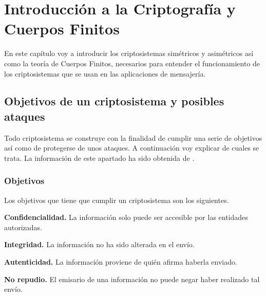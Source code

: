 \chapter{Introducción a la Criptografía y Cuerpos Finitos}
En este capítulo voy a introducir los criptosistemas simétricos y asimétricos así como la teoría de Cuerpos Finitos, necesarios para entender el funcionamiento de los criptosistemas que se usan en las aplicaciones de mensajería.\\

\section{Objetivos de un criptosistema y posibles ataques}
Todo criptosistema se construye con la finalidad de cumplir una serie de objetivos así como de protegerse de unos ataques. A continuación voy explicar de cuales se trata.
La información de este apartado ha sido obtenida de \cite{apuntesCriptografia}.\\ 
\subsection{Objetivos}
Los objetivos que tiene que cumplir un criptosistema son los siguientes.
\begin{description}
	\item \textbf{Confidencialidad.} 
		 La información solo puede ser accesible por las entidades autorizadas. 
	\item \textbf{Integridad.} 
		La información no ha sido alterada en el envío.
	\item \textbf{Autenticidad.} 
		La información proviene de quién afirma haberla enviado.
	\item \textbf{No repudio.}  
		El emisario de una información no puede negar haber realizado tal envío.
\end{description}
